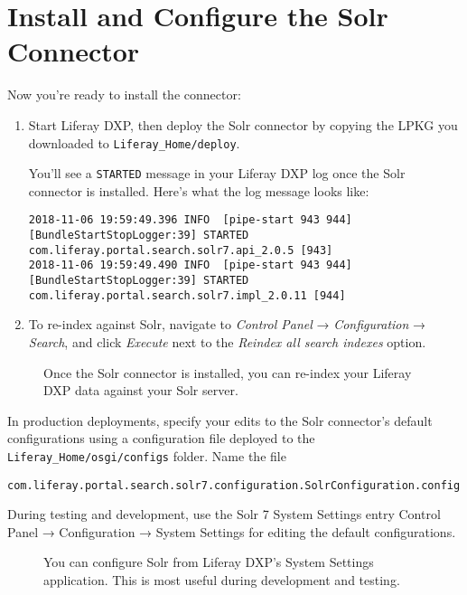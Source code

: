 \section{Install and Configure the Solr
Connector}\label{install-and-configure-the-solr-connector}

Now you're ready to install the connector:

\begin{enumerate}
\def\labelenumi{\arabic{enumi}.}
\item
  Start Liferay DXP, then deploy the Solr connector by copying the LPKG
  you downloaded to \texttt{Liferay\_Home/deploy}.

  You'll see a \texttt{STARTED} message in your Liferay DXP log once the
  Solr connector is installed. Here's what the log message looks like:

\begin{verbatim}
2018-11-06 19:59:49.396 INFO  [pipe-start 943 944][BundleStartStopLogger:39] STARTED com.liferay.portal.search.solr7.api_2.0.5 [943]
2018-11-06 19:59:49.490 INFO  [pipe-start 943 944][BundleStartStopLogger:39] STARTED com.liferay.portal.search.solr7.impl_2.0.11 [944]
\end{verbatim}
\item
  To re-index against Solr, navigate to \emph{Control Panel} →
  \emph{Configuration} → \emph{Search}, and click \emph{Execute} next to
  the \emph{Reindex all search indexes} option.
\end{enumerate}

\begin{figure}
\centering
{}
\caption{Once the Solr connector is installed, you can re-index your
Liferay DXP data against your Solr server.}
\end{figure}

In production deployments, specify your edits to the Solr connector's
default configurations using a configuration file deployed to the
\texttt{Liferay\_Home/osgi/configs} folder. Name the file

\begin{verbatim}
com.liferay.portal.search.solr7.configuration.SolrConfiguration.config
\end{verbatim}

During testing and development, use the Solr 7 System Settings entry
Control Panel → Configuration → System Settings for editing the default
configurations.

\begin{figure}
\centering
{}
\caption{You can configure Solr from Liferay DXP's System Settings
application. This is most useful during development and testing.}
\end{figure}

